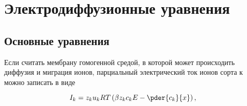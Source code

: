 \chapter{Электродиффузионные уравнения}
\section{Основные уравнения}

Если считать мембрану гомогенной средой, в которой может происходить диффузия и
миграция ионов, парциальный электрический ток ионов сорта к можно записать в
виде

\begin{equation}
    I_k = z_k u_k RT \left( \beta z_k c_k E - \pder{c_k}{x} \right),
    \label{eq:nernst-plank}
\end{equation}

